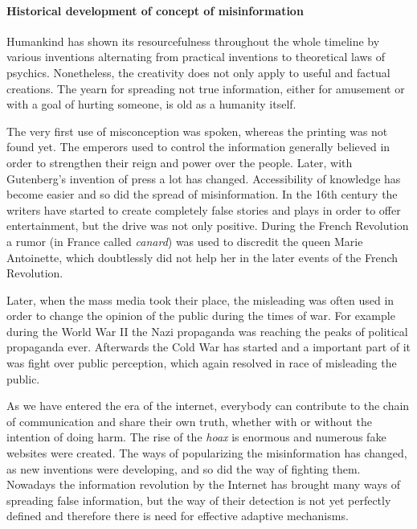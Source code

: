 \documentclass[11pt ,english,a4paper]{article}
\begin{document}
\paragraph{Historical development of concept of misinformation}%
Humankind has shown its resourcefulness throughout the whole timeline by various inventions alternating from practical inventions to theoretical laws of psychics. Nonetheless, the creativity does not only apply to useful and factual creations. The yearn for spreading not true information, either for amusement or with a goal of hurting someone, is old as a humanity itself. \cite{bur17history}%

The very first use of misconception was spoken, whereas the printing was not found yet. The emperors used to control the information generally believed in order to strengthen their reign and power over the people. \cite{bur17history} Later, with Gutenberg's invention of press a lot has changed. Accessibility of knowledge has become easier and so did the spread of misinformation. \cite{pos18short} In the 16th century the writers have started to create completely false stories and plays in order to offer entertainment, but the drive was not only positive. During the French Revolution a rumor (in France called \emph{canard}) was used to discredit the queen Marie Antoinette, which doubtlessly did not help her in the later events of the French Revolution. \cite{bur17history} 

Later, when the mass media took their place, the misleading was often used in order to change the opinion of the public during the times of war. For example during the World War II the Nazi propaganda was reaching the peaks of political propaganda ever. \cite{pos18short} Afterwards the Cold War has started and a important part of it was fight over public perception, which again resolved in race of misleading the public. \cite{pos18short}

As we have entered the era of the internet, everybody can contribute to the chain of communication and share their own truth, whether with or without the intention of doing harm. The rise of the \emph{hoax} is enormous and numerous fake websites were created.\cite{bur17history} The ways of popularizing the misinformation has changed, as new inventions were developing, and so did the way of fighting them. Nowadays the information revolution by the Internet has brought many ways of spreading false information, but the way of their detection is not yet perfectly defined and therefore there is need for effective adaptive mechanisms.
\end{document}
